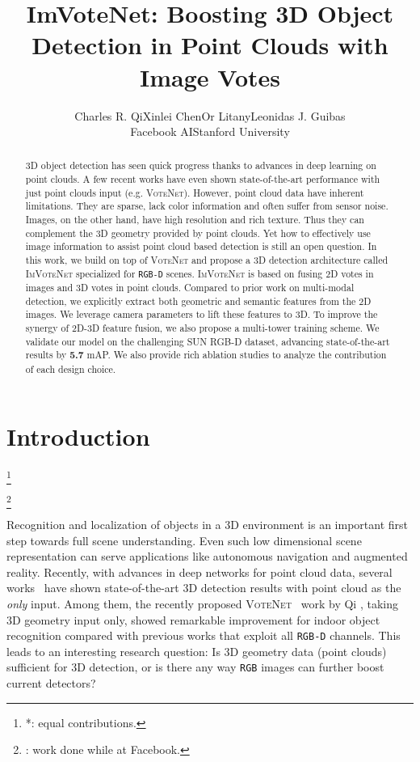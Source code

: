 \documentclass[10pt,twocolumn,letterpaper]{article}
\newcommand\blfootnote[1]{\begingroup
  \renewcommand\thefootnote{}\footnote{#1}\addtocounter{footnote}{-1}\endgroup
}
\newcommand{\votenet}{\textsc{VoteNet}\xspace}
\newcommand{\imvotenet}{\textsc{ImVoteNet}\xspace}
\newcommand{\rgbd}{\texttt{RGB-D}\xspace}
\newcommand{\rgb}{\texttt{RGB}\xspace}
\begin{document}
\title{ImVoteNet: Boosting 3D Object Detection in Point Clouds with Image Votes}



\author{Charles R. Qi\qquad Xinlei Chen\qquad Or Litany\qquad Leonidas J. Guibas\\
Facebook AI\qquad Stanford University}



\maketitle


\begin{abstract}
   3D object detection has seen quick progress thanks to advances in deep learning on point clouds. A few recent works have even shown state-of-the-art performance with just point clouds input (e.g. \votenet). However, point cloud data have inherent limitations. They are sparse, lack color information and often suffer from sensor noise. Images, on the other hand, have high resolution and rich texture. Thus they can complement the 3D geometry provided by point clouds. Yet how to effectively use image information to assist point cloud based detection is still an open question.
In this work, we build on top of \votenet and propose a 3D detection architecture called \imvotenet specialized for \rgbd scenes. \imvotenet is based on fusing 2D votes in images and 3D votes in point clouds. Compared to prior work on multi-modal detection, we explicitly extract both geometric and semantic features from the 2D images. We leverage camera parameters to lift these features to 3D. To improve the synergy of 2D-3D feature fusion, we also propose a multi-tower training scheme. We validate our model on the challenging SUN RGB-D dataset, advancing state-of-the-art results by {\bf 5.7} mAP.
We also provide rich ablation studies to analyze the contribution of each design choice. %
 \end{abstract}

\section{Introduction}
\blfootnote{*: equal contributions.}
\blfootnote{\dag: work done while at Facebook.}

Recognition and localization of objects in a 3D environment is an important first step towards full scene understanding. Even such low dimensional scene representation can serve applications like autonomous navigation and augmented reality. Recently, with advances in deep networks for point cloud data, several works~\cite{voteNet,zhou2018voxelnet,shi2018pointrcnn} have shown state-of-the-art 3D detection results with point cloud as the \emph{only} input. Among them, the recently proposed \votenet~\cite{voteNet} work by Qi \etal, taking 3D geometry input only, showed remarkable improvement for indoor object recognition compared with previous works that exploit all \rgbd channels. This leads to an interesting research question: Is 3D geometry data (point clouds) sufficient for 3D detection, or is there any way \rgb images can further boost current detectors?
\end{document}

